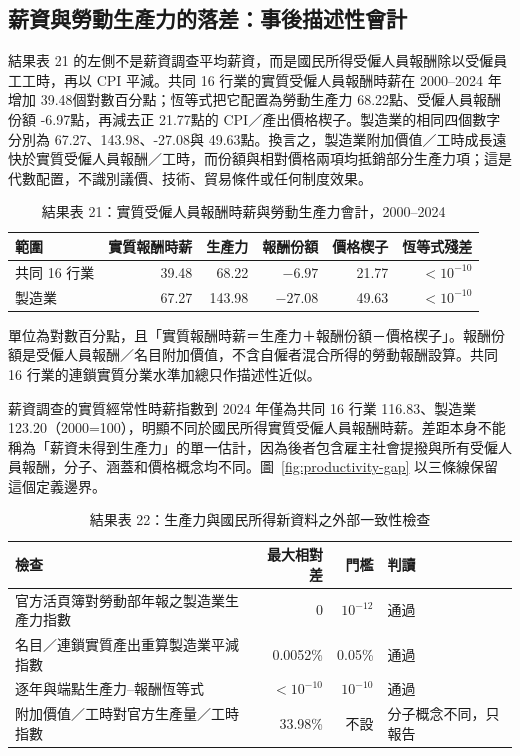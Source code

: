 \documentclass[12pt]{article}
\newcommand{\CommonCompGrowth}{39.48}
\newcommand{\CommonProductivityGrowth}{68.22}
\newcommand{\CommonLaborShareGrowth}{-6.97}
\newcommand{\CommonPriceWedge}{21.77}
\newcommand{\MfgCompGrowth}{67.27}
\newcommand{\MfgProductivityGrowth}{143.98}
\newcommand{\MfgLaborShareGrowth}{-27.08}
\newcommand{\MfgPriceWedge}{49.63}
\begin{document}
\subsection{薪資與勞動生產力的落差：事後描述性會計}

結果表 21 的左側不是薪資調查平均薪資，而是國民所得受僱人員報酬除以受僱員工工時，再以 CPI 平減。共同 16 行業的實質受僱人員報酬時薪在 2000--2024 年增加 \CommonCompGrowth 個對數百分點；恆等式把它配置為勞動生產力 \CommonProductivityGrowth 點、受僱人員報酬份額 \CommonLaborShareGrowth 點，再減去正 \CommonPriceWedge 點的 CPI／產出價格楔子。製造業的相同四個數字分別為 \MfgCompGrowth、\MfgProductivityGrowth、\MfgLaborShareGrowth 與 \MfgPriceWedge 點。換言之，製造業附加價值／工時成長遠快於實質受僱人員報酬／工時，而份額與相對價格兩項均抵銷部分生產力項；這是代數配置，不識別議價、技術、貿易條件或任何制度效果。

\begin{table}[htbp]
\caption{結果表 21：實質受僱人員報酬時薪與勞動生產力會計，2000--2024}
\centering\small
\begin{tabular}{lrrrrr}
\toprule
範圍 & 實質報酬時薪 & 生產力 & 報酬份額 & 價格楔子 & 恆等式殘差\\
\midrule
共同 16 行業 & 39.48 & 68.22 & $-6.97$ & 21.77 & $<10^{-10}$\\
製造業 & 67.27 & 143.98 & $-27.08$ & 49.63 & $<10^{-10}$\\
\bottomrule
\end{tabular}
\begin{tabnote}
單位為對數百分點，且「實質報酬時薪＝生產力＋報酬份額－價格楔子」。報酬份額是受僱人員報酬／名目附加價值，不含自僱者混合所得的勞動報酬設算。共同 16 行業的連鎖實質分業水準加總只作描述性近似。
\end{tabnote}
\end{table}

薪資調查的實質經常性時薪指數到 2024 年僅為共同 16 行業 116.83、製造業 123.20（2000=100），明顯不同於國民所得實質受僱人員報酬時薪。差距本身不能稱為「薪資未得到生產力」的單一估計，因為後者包含雇主社會提撥與所有受僱人員報酬，分子、涵蓋和價格概念均不同。圖~\ref{fig:productivity-gap} 以三條線保留這個定義邊界。

\begin{table}[htbp]
\caption{結果表 22：生產力與國民所得新資料之外部一致性檢查}
\centering\small
\begin{tabularx}{\textwidth}{XrrX}
\toprule
檢查 & 最大相對差 & 門檻 & 判讀\\
\midrule
官方活頁簿對勞動部年報之製造業生產力指數 & 0 & $10^{-12}$ & 通過\\
名目／連鎖實質產出重算製造業平減指數 & 0.0052\% & 0.05\% & 通過\\
逐年與端點生產力--報酬恆等式 & $<10^{-10}$ & $10^{-10}$ & 通過\\
附加價值／工時對官方生產量／工時指數 & 33.98\% & 不設 & 分子概念不同，只報告\\
\bottomrule
\end{tabularx}
\end{table}
\end{document}

